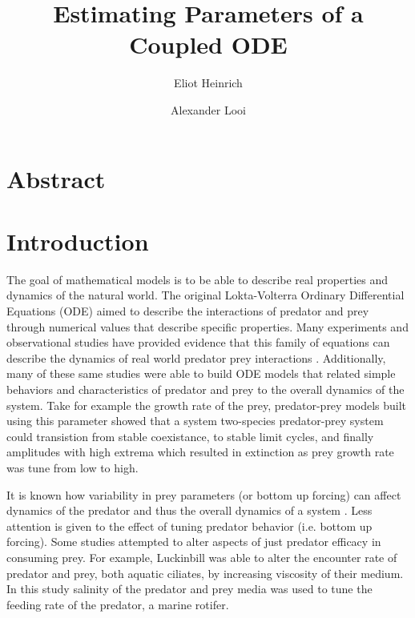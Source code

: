 \documentclass[twocolumn, 12pt]{article}
\title{Estimating Parameters of a Coupled ODE}
\author[1]{Eliot Heinrich}
\author[2]{Alexander Looi}
\affil[1]{University of Vermont, Undergraduate}
\affil[2]{University of Vermont, Graduate}
\begin{document}
\maketitle

\section*{Abstract}

\twocolumn

\section{Introduction} 

The goal of mathematical models is to be able to describe real properties and dynamics of the natural world. The original Lokta-Volterra Ordinary Differential Equations (ODE) aimed to describe the interactions of predator and prey through numerical values that describe specific properties. Many experiments and observational studies have provided evidence that this family of equations can describe the dynamics of real world predator prey interactions \cite{fussmann_crossing_2000, yoshida_rapid_2003, huffaker_experimental_1958, utida_cyclic_1957}. Additionally, many of these same studies were able to build ODE models that related simple behaviors and characteristics of predator and prey to the overall dynamics of the system. Take for example the growth rate of the prey, predator-prey models built using this parameter showed that a system two-species predator-prey system could transistion from stable coexistance, to stable limit cycles, and finally amplitudes with high extrema which resulted in extinction as prey growth rate was tune from low to high. 

It is known how variability in prey parameters (or bottom up forcing) can affect dynamics of the predator and thus the overall dynamics of a system \cite{smith_rosenzweig-macarthur_nodate, mccauley_physiological_1990, mccauley_growth_1990, mccauley_cyclic_1987, mccauley_large-amplitude_1999}. Less attention is given to the effect of tuning predator behavior (i.e. bottom up forcing). Some studies attempted to alter aspects of just predator efficacy in consuming prey. For example, Luckinbill \cite{luckinbill_coexistence_1973, luckinbill_effects_1974} was able to alter the encounter rate of predator and prey, both aquatic ciliates, by increasing viscosity of their medium. In this study salinity of the predator and prey media was used to tune the feeding rate of the predator, a marine rotifer. 
\end{document}
